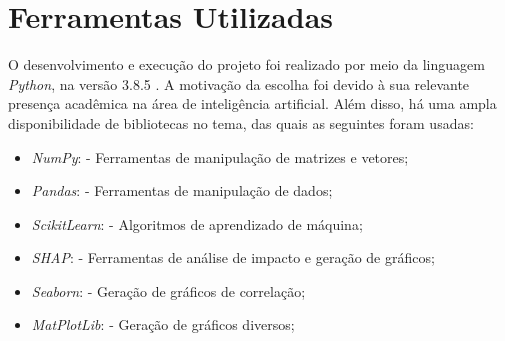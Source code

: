 \section{Ferramentas Utilizadas}
\label{sec:ferramentas}

O desenvolvimento e execução do projeto foi realizado por meio da linguagem \textit{Python}, na versão 3.8.5 \cite{python}. A motivação da escolha foi devido à sua relevante presença acadêmica na área de inteligência artificial. Além disso, há uma ampla disponibilidade de bibliotecas no tema, das quais as seguintes foram usadas:

\begin{itemize}
  \item \textit{NumPy}: \cite{numpy} - Ferramentas de manipulação de matrizes e vetores;
  \item \textit{Pandas}: \cite{pandas} - Ferramentas de manipulação de dados;
  \item \textit{ScikitLearn}: \cite{sklearn} - Algoritmos de aprendizado de máquina;
  \item \textit{SHAP}: \cite{shap} - Ferramentas de análise de impacto e geração de gráficos;
  \item \textit{Seaborn}: \cite{seaborn} - Geração de gráficos de correlação;
  \item \textit{MatPlotLib}: \cite{matplotlib} - Geração de gráficos diversos;
\end{itemize}